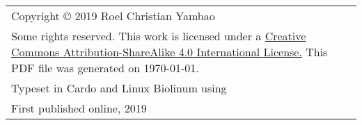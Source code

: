 \thispagestyle{empty}

    \vspace*{\fill}
\begin{flushleft}

\begin{tabularx}{\textwidth}{Y}
Copyright © 2019 Roel Christian Yambao\\
\addlinespace
Some rights reserved. This work is licensed under a
\href{https://creativecommons.org/licenses/by-sa/4.0/}{Creative Commons
Attribution-ShareAlike 4.0 International License.} This PDF file was generated on \today.\\
\addlinespace
Typeset in Cardo and Linux Biolinum using \LuaLaTeX{}\\
\addlinespace
First published online, 2019

\end{tabularx}

\end{flushleft}
